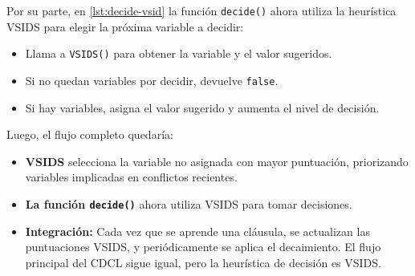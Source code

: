 Por su parte, en \ref{lst:decide-vsid} la función \texttt{decide()} ahora utiliza la heurística VSIDS para elegir la próxima variable a decidir:

\begin{itemize}
    \item Llama a \texttt{VSIDS()} para obtener la variable y el valor sugeridos.
    \item Si no quedan variables por decidir, devuelve \texttt{false}.
    \item Si hay variables, asigna el valor sugerido y aumenta el nivel de decisión.
\end{itemize}

Luego, el flujo completo quedar\'ia:

\begin{itemize}
    \item \textbf{VSIDS} selecciona la variable no asignada con mayor puntuación, priorizando variables implicadas en conflictos recientes.
    \item \textbf{La función \texttt{decide()}} ahora utiliza VSIDS para tomar decisiones.
    \item \textbf{Integración:} Cada vez que se aprende una cláusula, se actualizan las puntuaciones VSIDS, y periódicamente se aplica el decaimiento. El flujo principal del CDCL sigue igual, pero la heurística de decisión es VSIDS.
\end{itemize}




